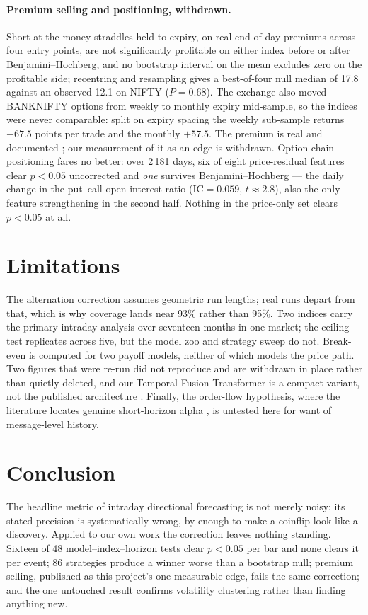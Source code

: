 \documentclass[runningheads]{llncs}
\begin{document}
\paragraph{Premium selling and positioning, withdrawn.}
Short at-the-money straddles held to expiry, on real end-of-day premiums across
four entry points, are not significantly profitable on either index before or
after Benjamini--Hochberg, and no bootstrap interval on the mean excludes zero on
the profitable side; recentring and resampling gives a best-of-four null median
of 17.8 against an observed 12.1 on NIFTY ($P=0.68$). The exchange also moved
BANKNIFTY options from weekly to monthly expiry mid-sample, so the indices were
never comparable: split on expiry spacing the weekly sub-sample returns $-67.5$
points per trade and the monthly $+57.5$. The premium is real and documented \cite{carr2009}; our measurement of it as an edge is withdrawn.
Option-chain positioning fares no better: over 2\,181 days, six of eight
price-residual features clear $p<0.05$ uncorrected and \emph{one} survives
Benjamini--Hochberg --- the daily change in the put--call open-interest ratio
($\text{IC}=0.059$, $t\approx 2.8$), also the only feature strengthening in the
second half. Nothing in the price-only set clears $p<0.05$ at all.

\section{Limitations}

The alternation correction assumes geometric run lengths; real runs depart from
that, which is why coverage lands near 93\% rather than 95\%. Two indices carry
the primary intraday analysis over seventeen months in one market; the ceiling
test replicates across five, but the model zoo and strategy sweep do not.
Break-even is computed for two payoff models, neither of which models the price
path. Two figures that were re-run did not reproduce and are withdrawn in place
rather than quietly deleted, and our Temporal Fusion Transformer is a compact
variant, not the published architecture \cite{lim2021}. Finally, the order-flow
hypothesis, where the literature locates genuine short-horizon alpha
\cite{kolm2023,zhang2019}, is untested here for want of message-level
history.

\section{Conclusion}

The headline metric of intraday directional forecasting is not merely noisy; its
stated precision is systematically wrong, by enough to make a coinflip look like
a discovery. Applied to our own work the correction leaves nothing standing. Sixteen of 48
model--index--horizon tests clear $p<0.05$ per bar and none clears it per event;
86 strategies produce a winner worse than a bootstrap null; premium selling,
published as this project's one measurable edge, fails the same correction; and
the one untouched result confirms volatility clustering rather than finding
anything new.
\end{document}
